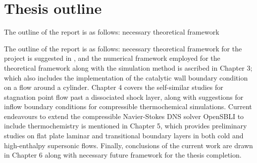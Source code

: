 \newpage

\section{Thesis outline}
The outline of the report is as follows: necessary theoretical framework 




The outline of the report is as follows: necessary theoretical framework for the project is suggested in , and the numerical framework employed for the theoretical framework along with the simulation method is ascribed in Chapter 3; which also includes the implementation of the catalytic wall boundary condition on a flow around a cylinder. Chapter 4 covers the self-similar studies for stagnation point flow past a dissociated shock layer, along with suggestions for inflow boundary conditions for compressible thermochemical simulations. Current endeavours to extend the compressible Navier-Stokes DNS solver OpenSBLI to include thermochemistry is mentioned in Chapter 5, which provides preliminary studies on flat plate laminar and transitional boundary layers in both cold and high-enthalpy supersonic flows. Finally, conclusions of the current work are drawn in Chapter 6 along with necessary future framework for the thesis completion. 